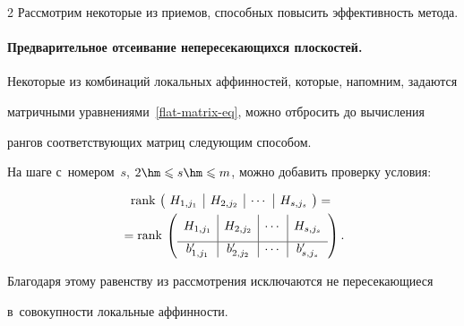 \begin{multicols}{2}
Рассмотрим некоторые из приемов, способных повысить эффективность метода.





\vspace*{-9pt}





\paragraph*{Предварительное отсеивание непересекающихся плоскостей.}


Некоторые из комбинаций локальных аффинностей, которые, напомним, задаются 


матричными уравнениями~\eqref{flat-matrix-eq}, можно отбросить до вычисления 


рангов соответствующих матриц следующим способом.


На шаге с~номером~$s$, $2\hm\leqslant s\hm\leqslant m$, можно добавить проверку условия:


\begin{multline*}


\rank \left(\!\begin{array}{c|c|c|c}


                H_{1,j_1} & H_{2,j_2} & \cdots & H_{s,j_s}\\


              \end{array}\!\right) ={}\\


              {}=


  \rank \left(\begin{array}{c|c|c|c}


                \rule{0pt}{1.2em} H_{1,j_1} & H_{2,j_2} & \cdots & 


H_{s,j_s}\\[6pt]


                \hline


                b'_{1,j_1} & b'_{2, j_2} & \cdots & b'_{s, j_s}


              \end{array}\right).


\end{multline*}


Благодаря этому равенству из рассмотрения исключаются не пересекающиеся 


в~совокупности локальные аффинности.



\end{multicols}

